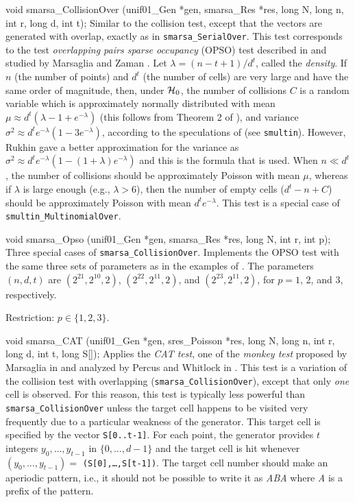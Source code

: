 void smarsa_CollisionOver (unif01_Gen *gen, smarsa_Res *res,
                           long N, long n, int r, long d, int t);
\endcode
  \tab
  Similar to the collision test, except
  that the vectors are generated
  with overlap, exactly as in {\tt smarsa\_SerialOver}.
  This test corresponds to the test {\em overlapping pairs sparse
  occupancy\/} (OPSO) test described in \cite {rMAR85a} and studied by
  Marsaglia and Zaman \cite{rMAR93a}.
  Let $\lambda = (n-t+1)/d^t$, called the {\em density}.
  If $n$ (the number of points) and $d^t$ (the number of cells)
  are very large and have the same order of magnitude,
  then,  under $\mathcal{H}_0$,
  the number of collisions $C$ is a random variable which is
  approximately normally distributed with mean
  $\mu \approx d^t (\lambda - 1 + e^{-\lambda})$
  (this follows from Theorem 2 of \cite{rPER95a}),
  and variance $\sigma^2 \approx d^t e^{-\lambda}(1-3e^{-\lambda})$,
  according to the speculations of \cite{rMAR93a} (see {\tt smultin}).
  However, Rukhin \cite{rRUK02a} gave a better approximation for the variance as
  $\sigma^2 \approx d^t e^{-\lambda}(1-(1+\lambda) e^{-\lambda})$ and this
  is the formula that is used.
  When $n \ll d^t$, the number of collisions should be
  approximately Poisson with mean $\mu$,
  whereas if $\lambda$ is large enough (e.g., $\lambda> 6$), then the
  number of empty cells ($d^t - n + C$)
  should be  approximately Poisson with mean $d^t e^{-\lambda}$.
  This test is a special case of {\tt smultin\_MultinomialOver}.
 \endtab
\code


void smarsa_Opso (unif01_Gen *gen, smarsa_Res *res,
                  long N, int r, int p);
\endcode
 \tab
   Three special cases of {\tt smarsa\_CollisionOver}.
   Implements the OPSO
   test with the same three sets of parameters
   as in the examples
   of \cite{rMAR85a}.
   The parameters $(n, d, t)$ are $(2^{21}, 2^{10}, 2)$,
   $(2^{22}, 2^{11}, 2)$,
   and  $(2^{23}, 2^{11}, 2)$, for $p = 1$, 2, and 3, respectively.

   Restriction: $p\in \{1, 2, 3\}$.
 \endtab
\code


void smarsa_CAT (unif01_Gen *gen, sres_Poisson *res,
                 long N, long n, int r, long d, int t, long S[]);
\endcode
\tab
 Applies the {\em CAT test\/}, one of the {\em monkey test\/} proposed by
 Marsaglia in \cite{rMAR93b} and analyzed by Percus and Whitlock in
 \cite{rPER95a}.
 This test is a variation of the collision test with overlapping
 ({\tt smarsa\_CollisionOver}), except that only {\em one\/} cell is
 observed. For this reason, this test is typically less powerful than
 {\tt smarsa\_CollisionOver} unless the target cell happens to be visited
 very frequently due to a particular weakness of the generator.
 This target cell is specified by the vector {\tt S[0..t-1]}.
 For each point, the generator provides $t$ integers
 $y_0,\dots,y_{t-1}$ in $\{0,\dots,d-1\}$ and the target cell is hit
 whenever $(y_0, \dots, y_{t-1}) =$ {\tt (S[0],\dots,S[t-1])}. The
 target cell number should make an aperiodic pattern, i.e., it should not
 be possible to write it as {\em ABA} where {\em A} is a prefix of the
 pattern.

